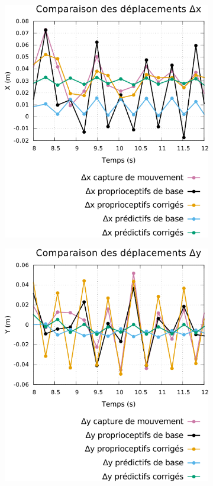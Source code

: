 \begin{figure}[htbp]
    \centerfloat
    \begin{subfigure}{0.29\paperwidth}
        \centering
        \includegraphics[type=pdf,ext=.pdf,read=.pdf,width=1.0\linewidth]{../plot/OdometryLWPR/grass_open_traj1_diff_x}
    \end{subfigure}
    \begin{subfigure}{0.29\paperwidth}
        \centering
        \includegraphics[type=pdf,ext=.pdf,read=.pdf,width=1.0\linewidth]{../plot/OdometryLWPR/grass_open_traj1_diff_y}

\end{subfigure}
\end{figure}
